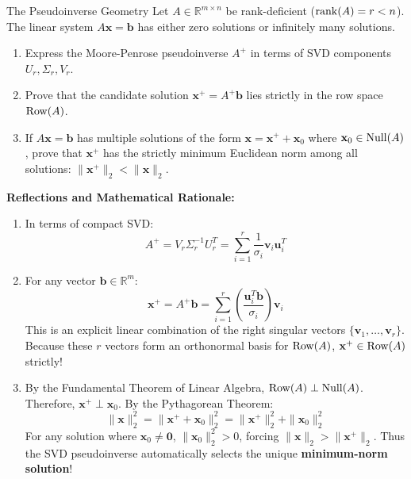 \begin{ponderbox}{The Pseudoinverse Geometry}
Let $A \in \mathbb{R}^{m \times n}$ be rank-deficient ($\operatorname{rank}(A) = r < n$). The linear system $A\mathbf{x} = \mathbf{b}$ has either zero solutions or infinitely many solutions.
\begin{enumerate}
    \item Express the Moore-Penrose pseudoinverse $A^+$ in terms of SVD components $U_r, \Sigma_r, V_r$.
    \item Prove that the candidate solution $\mathbf{x}^+ = A^+ \mathbf{b}$ lies strictly in the row space $\operatorname{Row}(A)$.
    \item If $A\mathbf{x} = \mathbf{b}$ has multiple solutions of the form $\mathbf{x} = \mathbf{x}^+ + \mathbf{x}_0$ where $\mathbf{x}_0 \in \operatorname{Null}(A)$, prove that $\mathbf{x}^+$ has the strictly minimum Euclidean norm among all solutions: $\|\mathbf{x}^+\|_2 < \|\mathbf{x}\|_2$.
\end{enumerate}
\tcblower
\textbf{Reflections and Mathematical Rationale:}
\begin{enumerate}
    \item In terms of compact SVD:
    \begin{equation*}
    A^+ = V_r \Sigma_r^{-1} U_r^T = \sum_{i=1}^r \frac{1}{\sigma_i} \mathbf{v}_i \mathbf{u}_i^T
    \end{equation*}
    \item For any vector $\mathbf{b} \in \mathbb{R}^m$:
    \begin{equation*}
    \mathbf{x}^+ = A^+ \mathbf{b} = \sum_{i=1}^r \left( \frac{\mathbf{u}_i^T \mathbf{b}}{\sigma_i} \right) \mathbf{v}_i
    \end{equation*}
    This is an explicit linear combination of the right singular vectors $\{\mathbf{v}_1, \dots, \mathbf{v}_r\}$. Because these $r$ vectors form an orthonormal basis for $\operatorname{Row}(A)$, $\mathbf{x}^+ \in \operatorname{Row}(A)$ strictly!
    \item By the Fundamental Theorem of Linear Algebra, $\operatorname{Row}(A) \perp \operatorname{Null}(A)$. Therefore, $\mathbf{x}^+ \perp \mathbf{x}_0$. By the Pythagorean Theorem:
    \begin{equation*}
    \|\mathbf{x}\|_2^2 = \|\mathbf{x}^+ + \mathbf{x}_0\|_2^2 = \|\mathbf{x}^+\|_2^2 + \|\mathbf{x}_0\|_2^2
    \end{equation*}
    For any solution where $\mathbf{x}_0 \ne \mathbf{0}$, $\|\mathbf{x}_0\|_2^2 > 0$, forcing $\|\mathbf{x}\|_2 > \|\mathbf{x}^+\|_2$. Thus the SVD pseudoinverse automatically selects the unique \textbf{minimum-norm solution}!
\end{enumerate}
\end{ponderbox}

